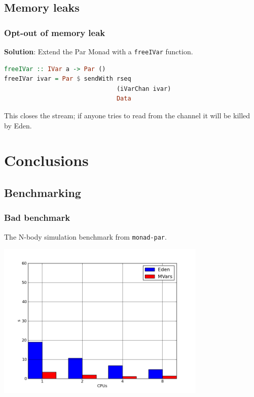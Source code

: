 \documentclass[12pt, danish]{beamer}
\begin{document}
\subsection{Memory leaks}

\begin{frame}[fragile]

  \frametitle{Opt-out of memory leak}

  \textbf{Solution}: Extend the Par Monad with a \texttt{freeIVar} function. 

  \begin{lstlisting}[language=Haskell]
freeIVar :: IVar a -> Par ()
freeIVar ivar = Par $ sendWith rseq 
                               (iVarChan ivar) 
                               Data
  \end{lstlisting}

  This closes the stream; if anyone tries to read from the channel it
  will be killed by Eden.  

\end{frame}

\section{Conclusions}

\subsection{Benchmarking}

\begin{frame}
\frametitle{Bad benchmark}

The N-body simulation benchmark from \texttt{monad-par}.

\includegraphics[width=10cm]{runtimes.png}
\end{frame}
\end{document}

